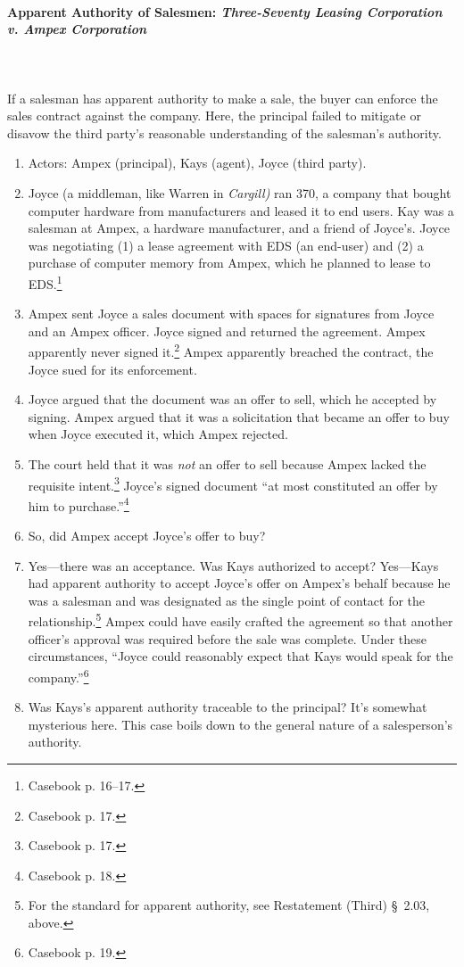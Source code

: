 \paragraph{Apparent Authority of Salesmen: \emph{Three-Seventy Leasing 
Corporation v. Ampex Corporation}}
~\\\\
If a salesman has apparent authority to make a sale, the buyer can enforce the 
sales contract against the company. Here, the principal failed to mitigate or 
disavow the third party's reasonable understanding of the salesman's 
authority.

\begin{enumerate}
    \item Actors: Ampex (principal), Kays (agent), Joyce (third party).
    \item Joyce (a middleman, like Warren in \emph{Cargill)} ran 370, a 
    company that bought computer hardware from manufacturers and leased it to 
    end users. Kay was a salesman at Ampex, a hardware manufacturer, and a 
    friend of Joyce's. Joyce was negotiating (1) a lease agreement with EDS 
    (an end-user) and (2) a purchase of computer memory from Ampex, which he 
    planned to lease to EDS.\footnote{Casebook p.  16--17.}
    \item Ampex sent Joyce a sales document with spaces for signatures from 
    Joyce and an Ampex officer. Joyce signed and returned the agreement. Ampex 
    apparently never signed it.\footnote{Casebook p. 17.} Ampex apparently 
    breached the contract, the Joyce sued for its enforcement.
    \item Joyce argued that the document was an offer to sell, which he 
    accepted by signing. Ampex argued that it was a solicitation that became 
    an offer to buy when Joyce executed it, which Ampex rejected.
    \item The court held that it was \emph{not} an offer to sell because Ampex 
    lacked the requisite intent.\footnote{Casebook p. 17.} Joyce's signed 
    document ``at most constituted an offer by him to 
    purchase.''\footnote{Casebook p. 18.}
    \item So, did Ampex accept Joyce's offer to buy?
    \item Yes---there was an acceptance. Was Kays authorized to accept? 
    Yes---Kays had apparent authority to accept Joyce's offer on Ampex's 
    behalf because he was a salesman and was designated as the single point of 
    contact for the relationship.\footnote{For the standard for apparent 
    authority, see Restatement (Third) \S\ 2.03, above.} Ampex could have 
    easily crafted the agreement so that another officer's approval was 
    required before the sale was complete. Under these circumstances, ``Joyce 
    could reasonably expect that Kays would speak for the 
    company.''\footnote{Casebook p. 19.}
    \item Was Kays's apparent authority traceable to the principal? It's 
    somewhat mysterious here. This case boils down to the general nature of a 
    salesperson's authority.
\end{enumerate}

